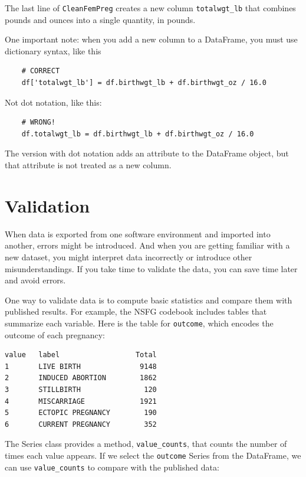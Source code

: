 \documentclass[12pt]{book}
\begin{document}
The last line of \verb"CleanFemPreg" creates a new
column \verb"totalwgt_lb" that combines pounds and ounces into
a single quantity, in pounds.

One important note: when you add a new column to a DataFrame, you
must use dictionary syntax, like this

\begin{verbatim}
    # CORRECT
    df['totalwgt_lb'] = df.birthwgt_lb + df.birthwgt_oz / 16.0 
\end{verbatim}

Not dot notation, like this:

\begin{verbatim}
    # WRONG!
    df.totalwgt_lb = df.birthwgt_lb + df.birthwgt_oz / 16.0 
\end{verbatim}

The version with dot notation adds an attribute to the DataFrame
object, but that attribute is not treated as a new column.


\section{Validation}

When data is exported from one software environment and imported into
another, errors might be introduced.  And when you are
getting familiar with a new dataset, you might interpret data
incorrectly or introduce other misunderstandings.  If you take
time to validate the data, you can save time later and avoid errors.

One way to validate data is to compute basic statistics and compare
them with published results.  For example, the NSFG codebook includes
tables that summarize each variable.  Here is the table for
\verb"outcome", which encodes the outcome of each pregnancy:

\begin{verbatim}
value   label                  Total
1       LIVE BIRTH              9148
2       INDUCED ABORTION        1862
3       STILLBIRTH               120
4       MISCARRIAGE             1921
5       ECTOPIC PREGNANCY        190
6       CURRENT PREGNANCY        352
\end{verbatim}

The Series class provides a method, \verb"value_counts", that
counts the number of times each value appears.  If we select the \verb"outcome"
Series from the DataFrame, we can use \verb"value_counts"
to compare with the published data:
\end{document}
